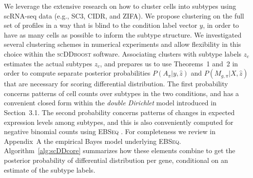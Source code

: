 \documentclass[11pt]{amsart}
\begin{document}
We leverage the extensive research on how to cluster cells into subtypes using scRNA-seq data (e.g., 
 SC3\cite{sc3}, CIDR\cite{CIDR}, and ZIFA\cite{ZIFA}).   We propose clustering on the full set
of profiles in a way that is blind to the condition label vector $y$, in order to have as many cells as possible
to inform the subtype structure.  We investigated several clustering schemes in numerical experiments and allow 
flexibility in this choice within the \textsc{scDDboost} software. 
Associating clusters with subtype labels $\hat z_c$  estimates
the actual subtypes $z_c$, and prepares us to use Theorems~1 and~2 in order to compute separate
posterior probabilities $P(A_\pi|y, \hat z)$ and $P(M_{g, \pi}| X, \hat z)$ that are necessary for scoring
differential distribution. The first probability concerns patterns of cell counts over subtypes in the two conditions,
and has a convenient closed form within the {\em double Dirichlet} model introduced in Section~3.1.
The second probability concerns patterns of changes in expected expression levels among subtypes, and this is
also conveniently computed for negative binomial counts using \textsc{EBSeq} \cite{ref:Leng}. For completeness
we review in Appendix~A the empirical Bayes model underlying \textsc{EBSeq}.  Algorithm~\ref{alg:scDDcore}
summarizes how these elements combine to get the posterior probability of differential distribution per gene,
conditional on an estimate of the subtype labels.


\end{document}
